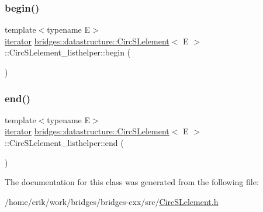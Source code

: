 \subsubsection{\texorpdfstring{begin()}{begin()}}
{\footnotesize\ttfamily template$<$typename E$>$ \\
\hyperlink{classbridges_1_1datastructure_1_1_circ_s_lelement_1_1_circ_s_lelement__listhelper_1_1iterator}{iterator} \hyperlink{classbridges_1_1datastructure_1_1_circ_s_lelement}{bridges\+::datastructure\+::\+Circ\+S\+Lelement}$<$ E $>$\+::Circ\+S\+Lelement\+\_\+listhelper\+::begin (\begin{DoxyParamCaption}{ }\end{DoxyParamCaption})\hspace{0.3cm}{\ttfamily [inline]}}

\mbox{\label{classbridges_1_1datastructure_1_1_circ_s_lelement_1_1_circ_s_lelement__listhelper_aceac5cae38d478dd16d2e44f329ea821}} 
\subsubsection{\texorpdfstring{end()}{end()}}
{\footnotesize\ttfamily template$<$typename E$>$ \\
\hyperlink{classbridges_1_1datastructure_1_1_circ_s_lelement_1_1_circ_s_lelement__listhelper_1_1iterator}{iterator} \hyperlink{classbridges_1_1datastructure_1_1_circ_s_lelement}{bridges\+::datastructure\+::\+Circ\+S\+Lelement}$<$ E $>$\+::Circ\+S\+Lelement\+\_\+listhelper\+::end (\begin{DoxyParamCaption}{ }\end{DoxyParamCaption})\hspace{0.3cm}{\ttfamily [inline]}}



The documentation for this class was generated from the following file\+:\begin{DoxyCompactItemize}
\item 
/home/erik/work/bridges/bridges-\/cxx/src/\hyperlink{_circ_s_lelement_8h}{Circ\+S\+Lelement.\+h}\end{DoxyCompactItemize}
